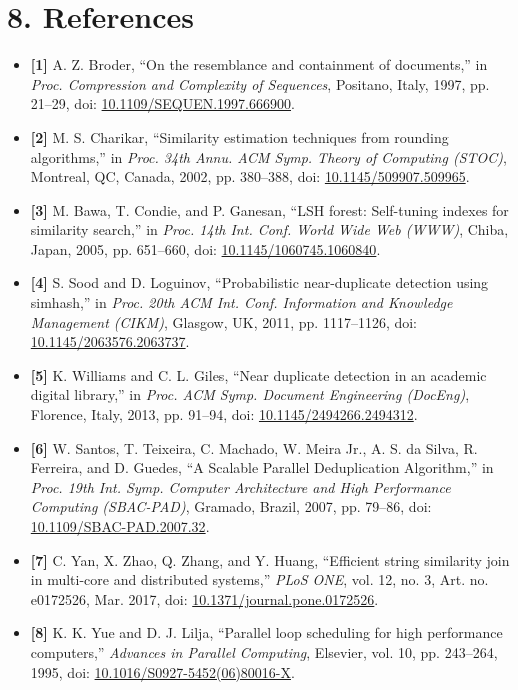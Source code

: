 \documentclass[11pt,a4paper]{article}
\renewcommand{\_}{\textunderscore\allowbreak}
\newcommand{\tocsection}[1]{%
  \phantomsection%
  \section*{#1}%
  \addcontentsline{toc}{section}{#1}%
}
\begin{document}
\clearpage
\tocsection{8. References}

\begin{itemize}[label={}, leftmargin=0pt, itemsep=0.45em]
    \item \textbf{[1]} A. Z. Broder, ``On the resemblance and containment of documents,'' in \textit{Proc. Compression and Complexity of Sequences}, Positano, Italy, 1997, pp. 21--29, doi: \href{https://doi.org/10.1109/SEQUEN.1997.666900}{10.1109/SEQUEN.1997.666900}.
    \item \textbf{[2]} M. S. Charikar, ``Similarity estimation techniques from rounding algorithms,'' in \textit{Proc. 34th Annu. ACM Symp. Theory of Computing (STOC)}, Montreal, QC, Canada, 2002, pp. 380--388, doi: \href{https://doi.org/10.1145/509907.509965}{10.1145/509907.509965}.
    \item \textbf{[3]} M. Bawa, T. Condie, and P. Ganesan, ``LSH forest: Self-tuning indexes for similarity search,'' in \textit{Proc. 14th Int. Conf. World Wide Web (WWW)}, Chiba, Japan, 2005, pp. 651--660, doi: \href{https://doi.org/10.1145/1060745.1060840}{10.1145/1060745.1060840}.
    \item \textbf{[4]} S. Sood and D. Loguinov, ``Probabilistic near-duplicate detection using simhash,'' in \textit{Proc. 20th ACM Int. Conf. Information and Knowledge Management (CIKM)}, Glasgow, UK, 2011, pp. 1117--1126, doi: \href{https://doi.org/10.1145/2063576.2063737}{10.1145/2063576.2063737}.
    \item \textbf{[5]} K. Williams and C. L. Giles, ``Near duplicate detection in an academic digital library,'' in \textit{Proc. ACM Symp. Document Engineering (DocEng)}, Florence, Italy, 2013, pp. 91--94, doi: \href{https://doi.org/10.1145/2494266.2494312}{10.1145/2494266.2494312}.
    \item \textbf{[6]} W. Santos, T. Teixeira, C. Machado, W. Meira Jr., A. S. da Silva, R. Ferreira, and D. Guedes, ``A Scalable Parallel Deduplication Algorithm,'' in \textit{Proc. 19th Int. Symp. Computer Architecture and High Performance Computing (SBAC-PAD)}, Gramado, Brazil, 2007, pp. 79--86, doi: \href{https://doi.org/10.1109/SBAC-PAD.2007.32}{10.1109/SBAC-PAD.2007.32}.
    \item \textbf{[7]} C. Yan, X. Zhao, Q. Zhang, and Y. Huang, ``Efficient string similarity join in multi-core and distributed systems,'' \textit{PLoS ONE}, vol. 12, no. 3, Art. no. e0172526, Mar. 2017, doi: \href{https://doi.org/10.1371/journal.pone.0172526}{10.1371/journal.pone.0172526}.
    \item \textbf{[8]} K. K. Yue and D. J. Lilja, ``Parallel loop scheduling for high performance computers,'' \textit{Advances in Parallel Computing}, Elsevier, vol. 10, pp. 243--264, 1995, doi: \href{https://doi.org/10.1016/S0927-5452(06)80016-X}{10.1016/S0927-5452(06)80016-X}.

\end{itemize}
\end{document}
